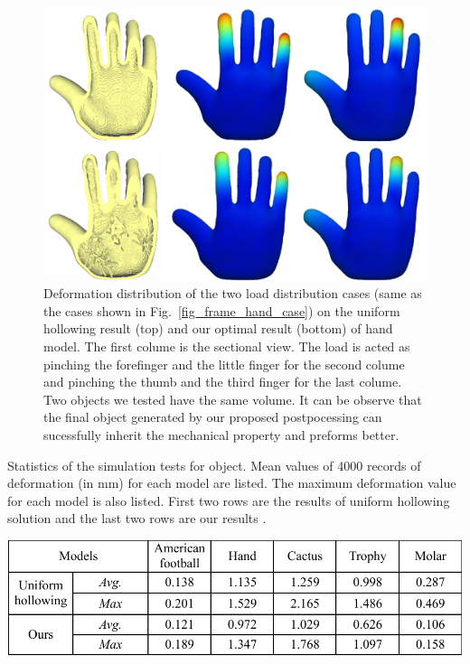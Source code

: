 \begin{figure}[h]
  \centering
  \includegraphics[width=0.5\linewidth]{Figures/hand/fig_obj_hand.pdf}
  \caption{\label{fig_obj_hand} Deformation distribution of the two load distribution cases (same as the cases shown in Fig.~\ref{fig_frame_hand_case}) on the uniform hollowing result (top) and our optimal result (bottom) of hand model. The first colume is the sectional view. The load is acted as pinching the forefinger and the little finger for the second colume and pinching the thumb and the third finger for the last colume. Two objects we tested have the same volume. It can be observe that the final object generated by our proposed postpocessing can sucessfully inherit the mechanical property and preforms better.}
\end{figure}

\begin{table}[htb]
\caption{\label{table_obj}Statistics of the simulation tests for object. Mean values of 4000 records of deformation (in mm) for each model are listed. The maximum deformation value for each model is also listed. First two rows are the results of uniform hollowing solution and the last two rows are our results .}
\centering
\includegraphics[width=0.5\linewidth]{Tables/table2}
\end{table}

